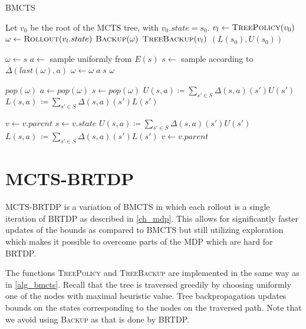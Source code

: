 \begin{algorithm}[H]
\caption{BMCTS}
\label{alg_bmcts}
\begin{algorithmic}[1]
    \State Let $v_0$ be the root of the MCTS tree, with $v_0.state = s_0$.
        \State $v_l \gets \Call{TreePolicy}{v_0}$
        \State $\omega \gets \Call{Rollout}{v_l.state}$
        \State $\Call{Backup}{\omega}$
        \State $\Call{TreeBackup}{v_l}$
    \EndWhile
    \State \Return $(L(s_0), U(s_0))$
\EndFunction

    \State $\omega \gets s$
        \State $a \gets$ sample uniformly from $E(s)$
        \State $s \gets$ sample according to $\Delta(last(\omega),a)$
        \State $\omega \gets \omega \; a \; s$
    \EndWhile
    \State \Return $\omega$
\EndFunction

    \State $pop(\omega)$
    \State $a \gets pop(\omega)$
    \State $s \gets pop(\omega)$
    \State $U(s,a) \coloneqq \sum_{s' \in S} \Delta(s,a)(s')U(s')$
    \State $L(s,a)\, \coloneqq \sum_{s' \in S} \Delta(s,a)(s')L(s')$
\EndWhile
\EndFunction

\State $v \gets v.parent$ 
    \State $s \gets v.state$
        \State $U(s,a) \coloneqq \sum_{s' \in S} \Delta(s,a)(s')U(s')$
        \State $L(s,a)\, \coloneqq \sum_{s' \in S} \Delta(s,a)(s')L(s')$
    \EndFor
    \State $v \gets v.parent$
\EndWhile
\EndFunction
\end{algorithmic}
\end{algorithm}


\section{MCTS-BRTDP}

MCTS-BRTDP is a variation of BMCTS in which each rollout is a
single iteration of BRTDP as described in \autoref{ch_mdp}. This allows
for significantly faster updates of the bounds as compared to BMCTS but
still utilizing exploration which makes it possible to overcome parts of
the MDP which are hard for BRTDP.

The functions \textsc{TreePolicy} and \textsc{TreeBackup} are
implemented in the same way as in \autoref{alg_bmcts}. Recall that the
tree is traversed greedily by choosing uniformly one of the nodes with
maximal heuristic value. Tree backpropagation updates bounds on the
states corresponding to the nodes on the traversed path. Note that we
avoid using \textsc{Backup} as that is done by BRTDP.

